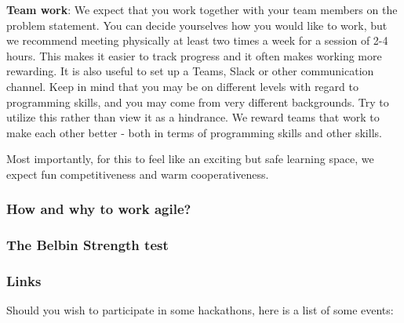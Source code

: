 \documentclass[
]{article}
\begin{document}
\textbf{Team work}: We expect that you work together with your team
members on the problem statement. You can decide yourselves how you
would like to work, but we recommend meeting physically at least two
times a week for a session of 2-4 hours. This makes it easier to track
progress and it often makes working more rewarding. It is also useful to
set up a Teams, Slack or other communication channel. Keep in mind that
you may be on different levels with regard to programming skills, and
you may come from very different backgrounds. Try to utilize this rather
than view it as a hindrance. We reward teams that work to make each
other better - both in terms of programming skills and other skills.

Most importantly, for this to feel like an exciting but safe learning
space, we expect fun competitiveness and warm cooperativeness.

\hypertarget{how-and-why-to-work-agile}{%
\subsubsection{How and why to work
agile?}\label{how-and-why-to-work-agile}}

\hypertarget{the-belbin-strength-test}{%
\subsubsection{The Belbin Strength
test}\label{the-belbin-strength-test}}

\hypertarget{links}{%
\subsubsection{Links}\label{links}}

Should you wish to participate in some hackathons, here is a list of
some events:
\end{document}
